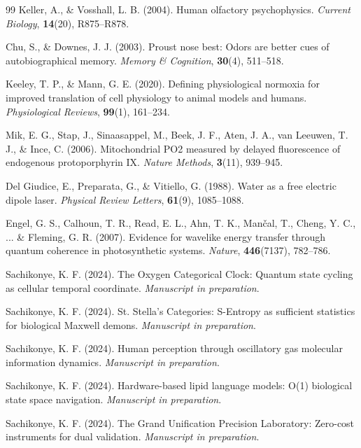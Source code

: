 \documentclass[12pt,a4paper]{article}
\begin{document}
\begin{thebibliography}{99}
Keller, A., \& Vosshall, L. B. (2004).
Human olfactory psychophysics.
\textit{Current Biology}, \textbf{14}(20), R875--R878.

Chu, S., \& Downes, J. J. (2003).
Proust nose best: Odors are better cues of autobiographical memory.
\textit{Memory \& Cognition}, \textbf{30}(4), 511--518.

Keeley, T. P., \& Mann, G. E. (2020).
Defining physiological normoxia for improved translation of cell physiology to animal models and humans.
\textit{Physiological Reviews}, \textbf{99}(1), 161--234.

Mik, E. G., Stap, J., Sinaasappel, M., Beek, J. F., Aten, J. A., van Leeuwen, T. J., \& Ince, C. (2006).
Mitochondrial PO2 measured by delayed fluorescence of endogenous protoporphyrin IX.
\textit{Nature Methods}, \textbf{3}(11), 939--945.

Del Giudice, E., Preparata, G., \& Vitiello, G. (1988).
Water as a free electric dipole laser.
\textit{Physical Review Letters}, \textbf{61}(9), 1085--1088.

Engel, G. S., Calhoun, T. R., Read, E. L., Ahn, T. K., Mančal, T., Cheng, Y. C., ... \& Fleming, G. R. (2007).
Evidence for wavelike energy transfer through quantum coherence in photosynthetic systems.
\textit{Nature}, \textbf{446}(7137), 782--786.

Sachikonye, K. F. (2024).
The Oxygen Categorical Clock: Quantum state cycling as cellular temporal coordinate.
\textit{Manuscript in preparation}.

Sachikonye, K. F. (2024).
St. Stella's Categories: S-Entropy as sufficient statistics for biological Maxwell demons.
\textit{Manuscript in preparation}.

Sachikonye, K. F. (2024).
Human perception through oscillatory gas molecular information dynamics.
\textit{Manuscript in preparation}.

Sachikonye, K. F. (2024).
Hardware-based lipid language models: O(1) biological state space navigation.
\textit{Manuscript in preparation}.

Sachikonye, K. F. (2024).
The Grand Unification Precision Laboratory: Zero-cost instruments for dual validation.
\textit{Manuscript in preparation}.


\end{thebibliography}
\end{document}
